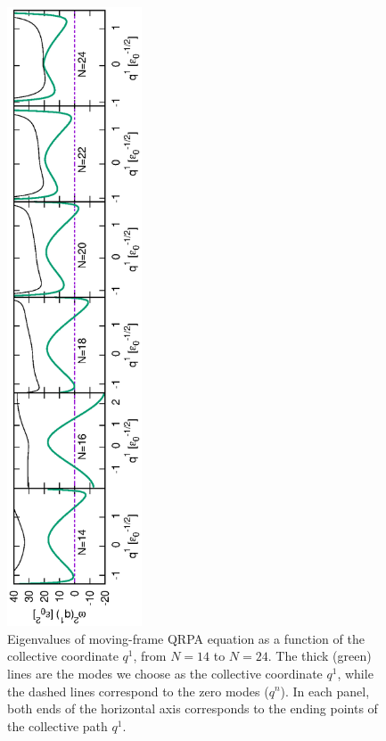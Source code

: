 \documentclass[11pt]{book} %
\begin{document}
\begin{figure}[tb]
 \begin{center}
  \includegraphics[width=40mm,angle=-90]{images/omega_sq.eps}
 \end{center}
 \caption{Eigenvalues of moving-frame QRPA equation as a function of
the collective coordinate $q^1$, from $N=14$ to $N=24$.
The thick (green) lines are the modes we choose as
the collective coordinate $q^1$,
while the dashed lines correspond to the zero modes ($q^n$).
In each panel, both ends of the horizontal axis corresponds
to the ending points of the collective path $q^1$.
}
 \label{omega_sq}
\end{figure}
\end{document}
